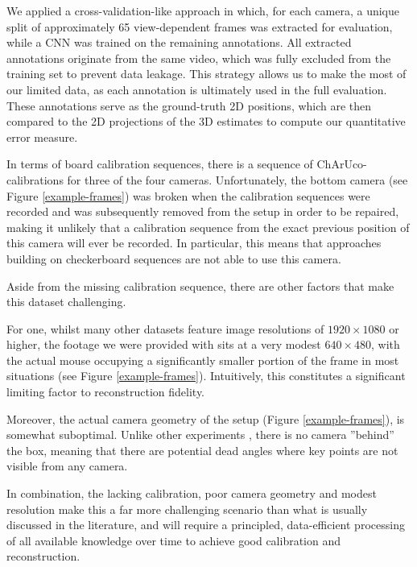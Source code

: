\documentclass[sigconf, nonacm]{acmart}
\begin{document}
We applied a cross-validation-like approach in which, for each camera, a unique split of approximately 65 view-dependent frames was extracted for evaluation, while a CNN was trained on the remaining annotations. All extracted annotations originate from the same video, which was fully excluded from the training set to prevent data leakage. This strategy allows us to make the most of our limited data, as each annotation is ultimately used in the full evaluation. These annotations serve as the ground-truth 2D positions, which are then compared to the 2D projections of the 3D estimates to compute our quantitative error measure.



\par
In terms of board calibration sequences, there is a sequence of ChArUco-calibrations for three of the four cameras. Unfortunately, the bottom camera (see Figure \ref{example-frames}) was broken when the calibration sequences were recorded and was subsequently removed from the setup in order to be repaired, making it unlikely that a calibration sequence from the exact previous position of this camera will ever be recorded. In particular, this means that approaches building on checkerboard sequences are not able to use this camera.\par
Aside from the missing calibration sequence, there are other factors that make this dataset challenging. \par For one, whilst many other datasets \cite{Joska2021, Karashchuk2021} feature image resolutions of $1920\times 1080$ or higher, the footage we were provided with sits at a very modest $640\times 480$, with the actual mouse occupying a significantly smaller portion of the frame in most situations (see Figure \ref{example-frames}). Intuitively, this constitutes a significant limiting factor to reconstruction fidelity. \par
Moreover, the actual camera geometry of the setup (Figure \ref{example-frames}), is somewhat suboptimal. Unlike other experiments \cite{Gnel2019, Joska2021}, there is no camera ''behind'' the box, meaning that there are potential dead angles where key points are not visible from any camera. \par
In combination, the lacking calibration, poor camera geometry and modest resolution make this a far more challenging scenario than what is usually discussed in the literature, and will require a principled, data-efficient processing of all available knowledge over time to achieve good calibration and reconstruction. 
\end{document}

